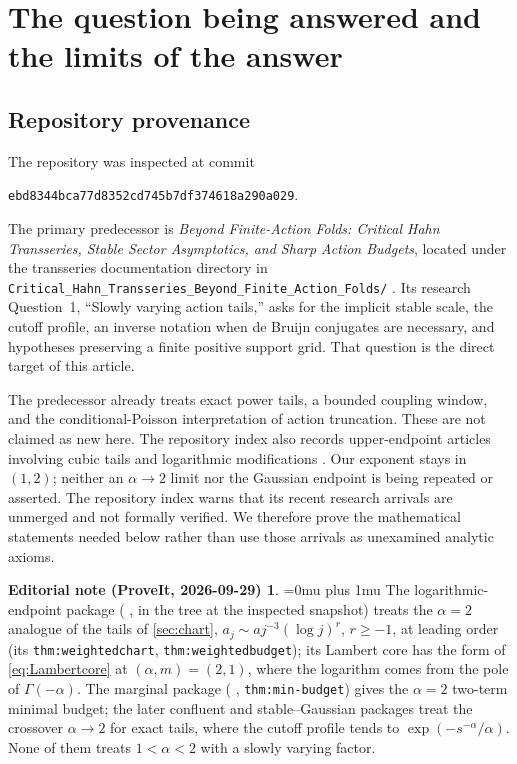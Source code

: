 \documentclass[11pt,a4paper]{article}
\numberwithin{equation}{section}
\theoremstyle{definition}\newtheorem{definition}[theorem]{Definition}
\theoremstyle{remark}\newtheorem{remark}[theorem]{Remark}
\theoremstyle{definition}
\newtheorem*{ednoteinner}{Editorial note (ProveIt, 2026-09-29)}
\newenvironment{ednote}{\begin{ednoteinner}\sloppy\Urlmuskip=0mu plus 1mu\relax}{\end{ednoteinner}}
\begin{document}
\section{The question being answered and the limits of the answer}
\label{sec:position}

\subsection{Repository provenance}
The repository was inspected at commit
\begin{center}\small\texttt{ebd8344bca77d8352cd745b7df374618a290a029}.\end{center}
The primary predecessor is \emph{Beyond Finite-Action Folds: Critical Hahn
Transseries, Stable Sector Asymptotics, and Sharp Action Budgets}, located
under the transseries documentation directory in
\texttt{Critical\_Hahn\_Transseries\_Beyond\_Finite\_Action\_Folds/}
\cite{repo-critical}. Its research Question~1, ``Slowly varying action tails,''
asks for the implicit stable scale, the cutoff profile, an inverse notation
when de Bruijn conjugates are necessary, and hypotheses preserving a finite
positive support grid. That question is the direct target of this article.

The predecessor already treats exact power tails, a bounded coupling window,
and the conditional-Poisson interpretation of action truncation. These are
not claimed as new here. The repository index also records upper-endpoint
articles involving cubic tails and logarithmic modifications
\cite{repo-index}. Our exponent stays in $(1,2)$; neither an $\alpha\to2$
limit nor the Gaussian endpoint is being repeated or asserted. The repository
index warns that its recent research arrivals are unmerged and not formally
verified. We therefore prove the mathematical statements needed below rather
than use those arrivals as unexamined analytic axioms.
\begin{ednote}
The logarithmic-endpoint package
( \cite{ed:lce}, in the
tree at the inspected snapshot) treats the $\alpha=2$ analogue of the tails
of \cref{sec:chart}, $a_j\sim aj^{-3}(\log j)^r$, $r\ge-1$, at leading
order (its \texttt{thm:weightedchart}, \texttt{thm:weightedbudget}); its
Lambert core has the form of \eqref{eq:Lambertcore} at $(\alpha,m)=(2,1)$,
where the logarithm comes from the pole of $\Gamma(-\alpha)$. The marginal
package ( \cite{ed:mct},
\texttt{thm:min-budget}) gives the $\alpha=2$ two-term minimal budget; the
later confluent and stable--Gaussian packages \cite{ed:cct,ed:sge} treat the
crossover $\alpha\to2$ for exact tails, where the cutoff profile tends to
$\exp(-s^{-\alpha}/\alpha)$. None of them treats $1<\alpha<2$ with a slowly
varying factor.
\end{ednote}
\end{document}
